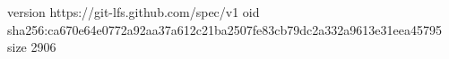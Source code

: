 version https://git-lfs.github.com/spec/v1
oid sha256:ca670e64e0772a92aa37a612c21ba2507fe83cb79dc2a332a9613e31eea45795
size 2906

